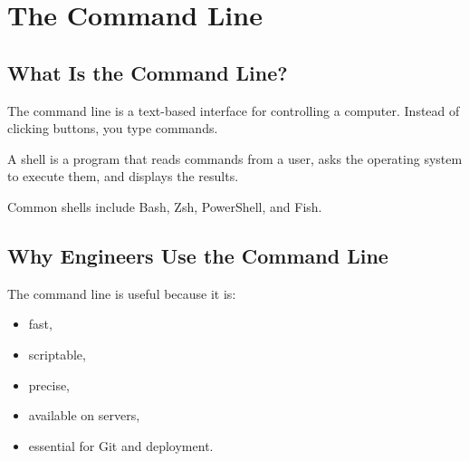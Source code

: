 \chapter{The Command Line}
\label{chap:command-line}



\section{What Is the Command Line?}

The command line is a text-based interface for controlling a computer. Instead of clicking buttons, you type commands.

\begin{definition}
A shell is a program that reads commands from a user, asks the operating system to execute them, and displays the results.
\end{definition}

Common shells include Bash, Zsh, PowerShell, and Fish.

\section{Why Engineers Use the Command Line}

The command line is useful because it is:

\begin{itemize}
    \item fast,
    \item scriptable,
    \item precise,
    \item available on servers,
    \item essential for Git and deployment.
\end{itemize}

